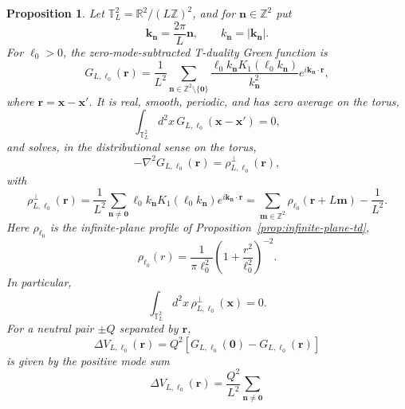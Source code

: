 \documentclass[openacc]{rsproca_new}%
\newtheorem{proposition}{\bf Proposition}[section]
\begin{document}
\begin{proposition}\label{prop:square-torus-zero-mode}
Let \(\mathbb T_L^2=\mathbb R^2/(L\mathbb Z)^2\), and for \(\mathbf n\in\mathbb Z^2\) put
\begin{equation}
  \mathbf k_{\mathbf n}=\frac{2\pi}{L}\mathbf n,
  \qquad
  k_{\mathbf n}=|\mathbf k_{\mathbf n}|.
\end{equation}
For $\ell_0>0$, the zero-mode-subtracted T-duality Green function is
\begin{equation}\label{t1}
  G_{L,\ell_0}(\mathbf r)=\frac{1}{L^2}\sum_{\mathbf n\in\mathbb Z^2\setminus\{\mathbf 0\}}
  \frac{\ell_0 k_{\mathbf n}K_1(\ell_0 k_{\mathbf n})}{k_{\mathbf n}^2}
  e^{i\mathbf k_{\mathbf n}\cdot\mathbf r},
\end{equation}
where \(\mathbf r=\mathbf x-\mathbf x'\). It is real, smooth, periodic, and has zero average on the torus,
\begin{equation}
  \int_{\mathbb T_L^2}d^2x\,G_{L,\ell_0}(\mathbf x-\mathbf x')=0,
\end{equation}
and solves, in the distributional sense on the torus,
\begin{equation}
  -\nabla^2G_{L,\ell_0}(\mathbf r)=\rho_{L,\ell_0}^{\perp}(\mathbf r),
\end{equation}
with
\begin{equation}
\rho_{L,\ell_0}^{\perp}(\mathbf r)=\frac{1}{L^2}\sum_{\mathbf n\neq\mathbf 0}\ell_0 k_{\mathbf n}K_1(\ell_0 k_{\mathbf n})e^{i\mathbf k_{\mathbf n}\cdot\mathbf r}=\sum_{\mathbf m\in\mathbb Z^2}\rho_{\ell_0}(\mathbf r+L\mathbf m)-\frac{1}{L^2}.
\end{equation}
Here \(\rho_{\ell_0}\) is the infinite-plane profile of Proposition~\ref{prop:infinite-plane-td},
\begin{equation}
  \rho_{\ell_0}(r)=\frac{1}{\pi\ell_0^2}\left(1+\frac{r^2}{\ell_0^2}\right)^{-2}.
\end{equation}
In particular,
\begin{equation}
  \int_{\mathbb T_L^2}d^2x\,\rho_{L,\ell_0}^{\perp}(\mathbf x)=0.
\end{equation}
For a neutral pair \(\pm Q\) separated by \(\mathbf r\),
\begin{equation}
  \Delta V_{L,\ell_0}(\mathbf r)=Q^2\left[G_{L,\ell_0}(\mathbf 0)-G_{L,\ell_0}(\mathbf r)\right]
\end{equation}
is given by the positive mode sum
\begin{equation}\label{DVT}
\Delta V_{L,\ell_0}(\mathbf r)=\frac{Q^2}{L^2}\sum_{\mathbf n\neq\mathbf 0}

\end{equation}
\end{proposition}
\end{document}
